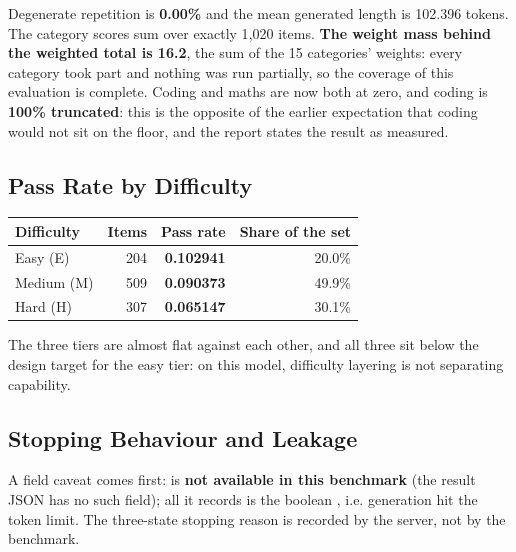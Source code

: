 Degenerate repetition is \textbf{0.00\%} and the mean generated length is 102.396 tokens. The
category scores sum over exactly 1{,}020 items. \textbf{The weight mass behind the weighted total
is 16.2}, the sum of the 15 categories' weights: every category took part and nothing was run
partially, so the coverage of this evaluation is complete. Coding and maths are now both at zero,
and coding is \textbf{100\% truncated}: this is the opposite of the earlier expectation that
coding would not sit on the floor, and the report states the result as measured.

\subsection{Pass Rate by Difficulty}

\begin{center}\small
\begin{tabular}{@{}lrrr@{}}
\toprule
\textbf{Difficulty} & \textbf{Items} & \textbf{Pass rate} & \textbf{Share of the set} \\
\midrule
Easy (E) & 204 & \textbf{0.102941} & 20.0\% \\
Medium (M) & 509 & \textbf{0.090373} & 49.9\% \\
Hard (H) & 307 & \textbf{0.065147} & 30.1\% \\
\bottomrule
\end{tabular}
\end{center}

The three tiers are almost flat against each other, and all three sit below the design target for
the easy tier: on this model, difficulty layering is not separating capability.

\subsection{Stopping Behaviour and Leakage}

A field caveat comes first:  is \textbf{not available in this benchmark} (the
result JSON has no such field); all it records is the boolean , i.e. generation hit
the token limit. The three-state stopping reason is recorded by the server, not by the benchmark.

